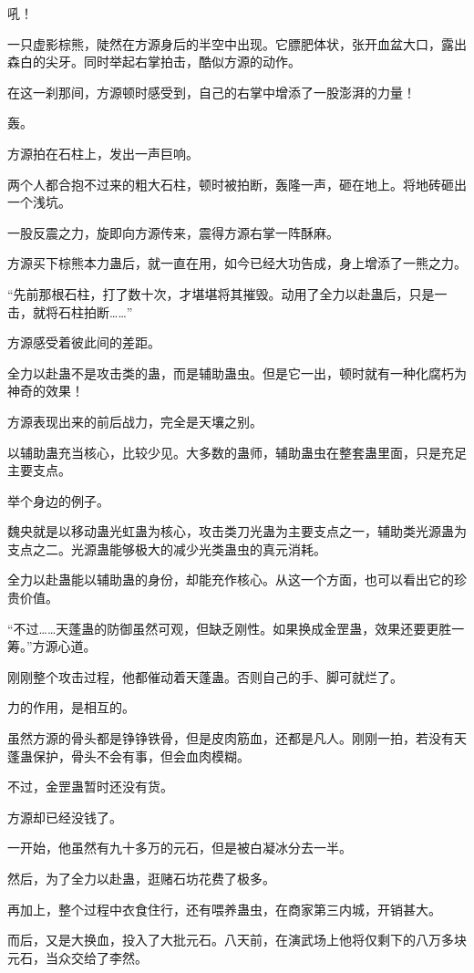 \begin{this_body}
吼！

一只虚影棕熊，陡然在方源身后的半空中出现。它膘肥体状，张开血盆大口，露出森白的尖牙。同时举起右掌拍击，酷似方源的动作。

在这一刹那间，方源顿时感受到，自己的右掌中增添了一股澎湃的力量！

轰。

方源拍在石柱上，发出一声巨响。

两个人都合抱不过来的粗大石柱，顿时被拍断，轰隆一声，砸在地上。将地砖砸出一个浅坑。

一股反震之力，旋即向方源传来，震得方源右掌一阵酥麻。

方源买下棕熊本力蛊后，就一直在用，如今已经大功告成，身上增添了一熊之力。

“先前那根石柱，打了数十次，才堪堪将其摧毁。动用了全力以赴蛊后，只是一击，就将石柱拍断……”

方源感受着彼此间的差距。

全力以赴蛊不是攻击类的蛊，而是辅助蛊虫。但是它一出，顿时就有一种化腐朽为神奇的效果！

方源表现出来的前后战力，完全是天壤之别。

以辅助蛊充当核心，比较少见。大多数的蛊师，辅助蛊虫在整套蛊里面，只是充足主要支点。

举个身边的例子。

魏央就是以移动蛊光虹蛊为核心，攻击类刀光蛊为主要支点之一，辅助类光源蛊为支点之二。光源蛊能够极大的减少光类蛊虫的真元消耗。

全力以赴蛊能以辅助蛊的身份，却能充作核心。从这一个方面，也可以看出它的珍贵价值。

“不过……天蓬蛊的防御虽然可观，但缺乏刚性。如果换成金罡蛊，效果还要更胜一筹。”方源心道。

刚刚整个攻击过程，他都催动着天蓬蛊。否则自己的手、脚可就烂了。

力的作用，是相互的。

虽然方源的骨头都是铮铮铁骨，但是皮肉筋血，还都是凡人。刚刚一拍，若没有天蓬蛊保护，骨头不会有事，但会血肉模糊。

不过，金罡蛊暂时还没有货。

方源却已经没钱了。

一开始，他虽然有九十多万的元石，但是被白凝冰分去一半。

然后，为了全力以赴蛊，逛赌石坊花费了极多。

再加上，整个过程中衣食住行，还有喂养蛊虫，在商家第三内城，开销甚大。

而后，又是大换血，投入了大批元石。八天前，在演武场上他将仅剩下的八万多块元石，当众交给了李然。


\end{this_body}
